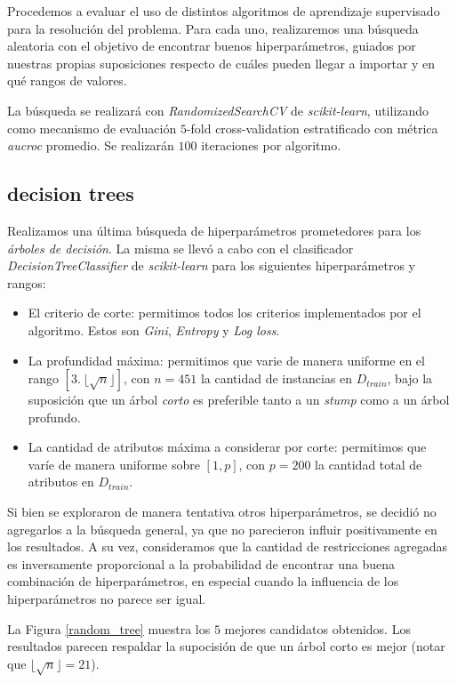 Procedemos a evaluar el uso de distintos algoritmos de aprendizaje supervisado para la resolución del problema. Para cada uno, realizaremos una búsqueda aleatoria con el objetivo de encontrar buenos hiperparámetros, guiados por nuestras propias suposiciones respecto de cuáles pueden llegar a importar y en qué rangos de valores.

La búsqueda se realizará con \textit{RandomizedSearchCV} de \textit{scikit-learn}, utilizando como mecanismo de evaluación $5$-fold cross-validation estratificado con métrica \textit{aucroc} promedio. Se realizarán $100$ iteraciones por algoritmo.

\subsection{decision trees}
Realizamos una última búsqueda de hiperparámetros prometedores para los \textit{árboles de decisión}. La misma se llevó a cabo con el clasificador \textit{DecisionTreeClassifier} de \textit{scikit-learn} para los siguientes hiperparámetros y rangos: 

\begin{itemize}
    \item El criterio de corte: permitimos todos los criterios implementados por el algoritmo. Estos son \textit{Gini}, \textit{Entropy} y \textit{Log loss}.
    \item La profundidad máxima: permitimos que varie de manera uniforme en el rango $[3.\ \lfloor\sqrt{n} \rfloor]$, con $n=451$ la cantidad de instancias en $D_{train}$, bajo la suposición que un árbol \textit{corto} es preferible tanto a un \textit{stump} como a un árbol profundo. 
    \item La cantidad de atributos máxima a considerar por corte: permitimos que varíe de manera uniforme sobre $[1, p]$, con $p = 200$ la cantidad total de atributos en $D_{train}$.
\end{itemize}

Si bien se exploraron de manera tentativa otros hiperparámetros, se decidió no agregarlos a la búsqueda general, ya que no parecieron influir positivamente en los resultados. A su vez, consideramos que la cantidad de restricciones agregadas es inversamente proporcional a la probabilidad de encontrar una buena combinación de hiperparámetros, en especial cuando la influencia de los hiperparámetros no parece ser igual. 

La Figura \ref{random_tree} muestra los $5$ mejores candidatos obtenidos. Los resultados parecen respaldar la supocisión de que un árbol corto es mejor (notar que $\lfloor\sqrt{n} \rfloor = 21$).

